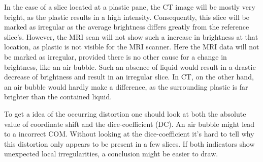 In the case of a slice located at a plastic pane, the CT image will be mostly very bright, as the plastic results in a high intensity.
Consequently, this slice will be marked as irregular as the average brightness differs greatly from the reference slice's.
However, the MRI scan will not show such a increase in brightness at that location, as plastic is not visible for the MRI scanner.
Here the MRI data will not be marked as irregular, provided there is no other cause for a change in brightness, like an air bubble.
Such an absence of liquid would result in a drastic decrease of brightness and result in an irregular slice.
In CT, on the other hand, an air bubble would hardly make a difference, as the surrounding plastic is far brighter than the contained liquid.





To get a idea of the occurring distortion one should look at both the absolute value of coordinate shift and the dice-coefficient (DC).
An air bubble might lead to a incorrect COM. Without looking at the dice-coefficient it's hard to tell why this distortion only appears to be present in a few slices.
If both indicators show unexpected local irregularities, a conclusion might be easier to draw.

